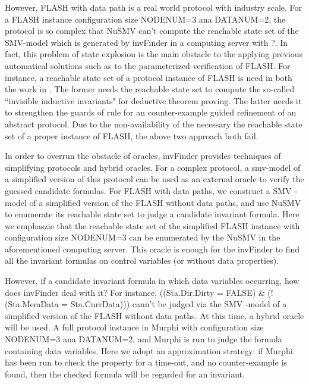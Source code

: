 \documentclass{llncs}
\begin{document}
However, FLASH with data path is a real world protocol with industry scale. For a FLASH   instance configuration size NODENUM=3 ana DATANUM=2, the protocol is so complex that NuSMV can't compute the reachable state set of the SMV-model which is generated by {\sf invFinder} in a computing server with ?. In fact, this problem of  state explosion is the main obstacle to the applying previous automatical solutions such as \cite{Arons2001,Lv2007} to the parameterized verification of FLASH. For instance, a reachable state set of a protocol instance of FLASH is need in both the work in \cite{Arons2001,Lv2007}. The former needs the reachable state set to compute the so-called ``invisible inductive invariants" for deductive theorem proving. The latter needs it to strengthen
 the guards of rule for an counter-example guided refinement of an abstract protocol. Due to the non-availability of the necessary the reachable state set of a proper instance of FLASH, the above two approach both fail.

 In order to overrun the obstacle of oracles, {\sf invFinder} provides techniques of simplifying protocols and hybrid oracles. For a complex protocol, a smv-model of a  simplified version of this protocol can be used as an external oracle to verify the guessed candidate formulas. For FLASH with data paths,  we construct a SMV -model of a simplified version of the FLASH without data paths, and use NuSMV to enumerate its reachable state set to judge a candidate invariant formula. Here we  emphaszie that the reachable state set of the simplified FLASH  instance  with configuration size NODENUM=3 can be enumerated by the NuSMV in the aforementioned computing server. This oracle is enough for the {\sf invFinder} to find all the invariant formulas on control variables (or without data properties).

 However, if a candidate invariant formula in which data variables occurring, how does {\sf invFinder} deal with it?  For instance, ((Sta.Dir.Dirty = FALSE) \& (!(Sta.MemData = Sta.CurrData))) cann't be judged via the SMV -model of a simplified version of the FLASH without data paths. At this time, a hybrid oracle will be used.  A full protocol instance in Murphi  with configuration size NODENUM=3 ana DATANUM=2, and  Murphi is run to judge the formula containing data variables. Here we adopt an approximation strategy: if Murphi has been run to check the property for a time-out, and no counter-example is found, then the checked formula will be regarded for an invariant.
\end{document}

